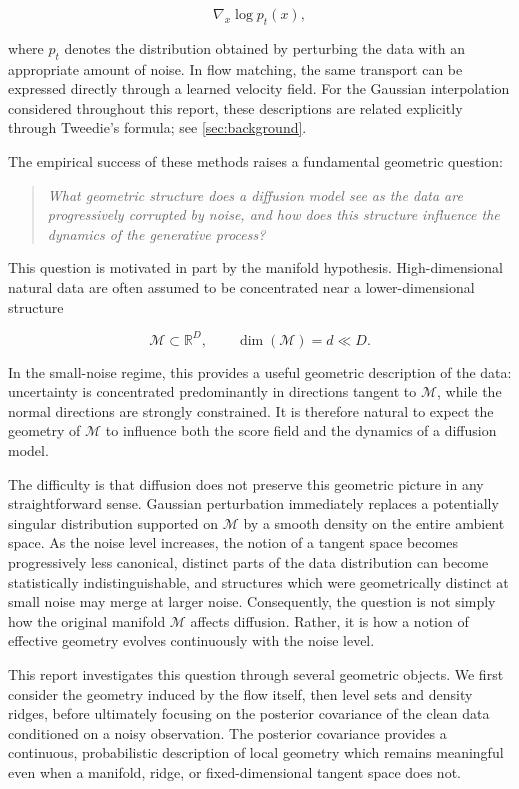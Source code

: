 \documentclass{article}
\newcommand{\R}{\mathbb{R}}
\newcommand{\M}{\mathcal{M}}
\theoremstyle{plain}
\theoremstyle{definition}
\theoremstyle{remark}
\begin{document}
$$
    \nabla_x \log p_t(x),
$$

where $p_t$ denotes the distribution obtained by perturbing the data with an appropriate amount of noise. In flow matching, the same transport can be expressed directly through a learned velocity field. For the Gaussian interpolation considered throughout this report, these descriptions are related explicitly through Tweedie's formula; see \autoref{sec:background}.

The empirical success of these methods raises a fundamental geometric question:

\begin{quote}
\emph{What geometric structure does a diffusion model see as the data are progressively corrupted by noise, and how does this structure influence the dynamics of the generative process?}
\end{quote}

This question is motivated in part by the manifold hypothesis. High-dimensional natural data are often assumed to be concentrated near a lower-dimensional structure

$$
    \M \subset \R^D,
    \qquad
    \dim(\M)=d\ll D.
$$

In the small-noise regime, this provides a useful geometric description of the data: uncertainty is concentrated predominantly in directions tangent to $\M$, while the normal directions are strongly constrained. It is therefore natural to expect the geometry of $\M$ to influence both the score field and the dynamics of a diffusion model.

The difficulty is that diffusion does not preserve this geometric picture in any straightforward sense. Gaussian perturbation immediately replaces a potentially singular distribution supported on $\M$ by a smooth density on the entire ambient space. As the noise level increases, the notion of a tangent space becomes progressively less canonical, distinct parts of the data distribution can become statistically indistinguishable, and structures which were geometrically distinct at small noise may merge at larger noise. Consequently, the question is not simply how the original manifold $\M$ affects diffusion. Rather, it is how a notion of effective geometry evolves continuously with the noise level.

This report investigates this question through several geometric objects. We first consider the geometry induced by the flow itself, then level sets and density ridges, before ultimately focusing on the posterior covariance of the clean data conditioned on a noisy observation. The posterior covariance provides a continuous, probabilistic description of local geometry which remains meaningful even when a manifold, ridge, or fixed-dimensional tangent space does not.
\end{document}
